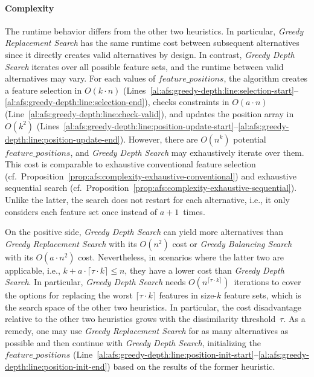 \documentclass{article}
\theoremstyle{definition}
\begin{document}
\paragraph{Complexity}

The runtime behavior differs from the other two heuristics.
In particular, \emph{Greedy Replacement Search} has the same runtime cost between subsequent alternatives since it directly creates valid alternatives by design.
In contrast, \emph{Greedy Depth Search} iterates over all possible feature sets, and the runtime between valid alternatives may vary.
For each values of $feature\_positions$, the algorithm creates a feature selection in $O(k \cdot n)$ (Lines~\ref{al:afs:greedy-depth:line:selection-start}--\ref{al:afs:greedy-depth:line:selection-end}), checks constraints in $O(a \cdot n)$ (Line~\ref{al:afs:greedy-depth:line:check-valid}), and updates the position array in~$O(k^2)$ (Lines~\ref{al:afs:greedy-depth:line:position-update-start}--\ref{al:afs:greedy-depth:line:position-update-end}).
However, there are $O(n^k)$ potential $feature\_positions$, and \emph{Greedy Depth Search} may exhaustively iterate over them.
This cost is comparable to exhaustive conventional feature selection (cf.~Proposition~\ref{prop:afs:complexity-exhaustive-conventional}) and exhaustive sequential search (cf.~Proposition~\ref{prop:afs:complexity-exhaustive-sequential}).
Unlike the latter, the search does not restart for each alternative, i.e., it only considers each feature set once instead of $a+1$~times.

On the positive side, \emph{Greedy Depth Search} can yield more alternatives than \emph{Greedy Replacement Search} with its $O(n^2)$ cost or \emph{Greedy Balancing Search} with its $O(a \cdot n^2)$ cost.
Nevertheless, in scenarios where the latter two are applicable, i.e., $k + a \cdot \lceil \tau \cdot k \rceil \leq n$, they have a lower cost than \emph{Greedy Depth Search}.
In particular, \emph{Greedy Depth Search} needs $O(n^{\lceil \tau \cdot k \rceil})$~iterations to cover the options for replacing the worst $\lceil \tau \cdot k \rceil$ features in size-$k$ feature sets, which is the search space of the other two heuristics.
In particular, the cost disadvantage relative to the other two heuristics grows with the dissimilarity threshold~$\tau$.
As a remedy, one may use \emph{Greedy Replacement Search} for as many alternatives as possible and then continue with \emph{Greedy Depth Search}, initializing the $feature\_positions$ (Line~\ref{al:afs:greedy-depth:line:position-init-start}--\ref{al:afs:greedy-depth:line:position-init-end}) based on the results of the former heuristic.
\end{document}
